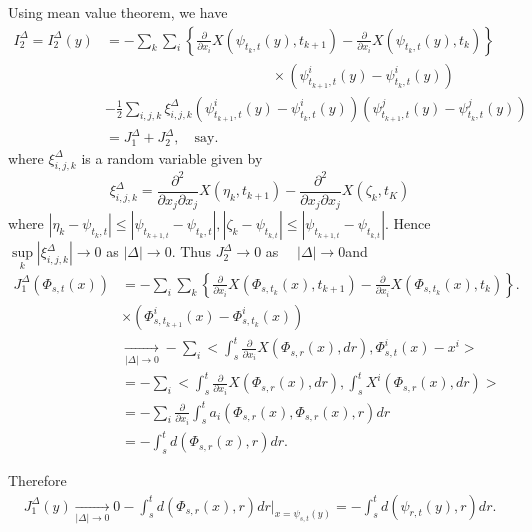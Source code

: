 Using mean value theorem, we have
\begin{align*}
  I_2^{\Delta} = I_2^{\Delta}(y) & = - \sum_k \sum_i \left\{
  \frac{\partial}{\partial x_i} X(\psi_{t_k, t}(y), t_{k+1})
  -\frac{\partial}{\partial x_i} X(\psi_{t_k,  t}(y), t_k) \right\}\\ 
  & \hspace{5cm} \times (\psi^i_{t_{k+1}, t}(y)- \psi^i_{t_k, t}(y))\\
  & - \frac{1}{2} \sum_{i, j, k} \xi^{\Delta}_{i, j,
    k}(\psi^i_{t_{k+1}, t}(y) - \psi^i_{t_k, t}(y)) (\psi^j_{t_{k+1},
    t}(y) - \psi^j_{t_k, t}(y))\\ 
  & = J^{\Delta}_1 + J^{\Delta}_2, \quad \text{say}.
\end{align*}
where $\xi^{\Delta}_{i, j, k}$ is a random variable given by
$$
\xi^{\Delta}_{i, j, k} = \frac{\partial^2}{\partial x_j \partial x_j} 
X(\eta_k, t_{k+1}) - \frac{\partial^2}{\partial x_j \partial x_j}
X(\zeta_k, t_K) 
$$
where $|\eta_k - \psi_{t_k, t}| \le |\psi_{t_{k+1, t}} - \psi_{t_k, t}|,
|\zeta_k - \psi_{t_{k, t}}|\le |\psi_{t_{k+1, t}} - \psi_{t_{k, t}}|$.
Hence \quad  $\sup\limits_k |\xi^{\Delta}_{i, j, k}| \rightarrow 0$
\quad as \quad $|\Delta|\rightarrow 0$. \quad  Thus \quad
$J^{\Delta}_2 \rightarrow 0$ \quad as $\quad   |\Delta|\rightarrow 0
$\quad and 
\begin{align*}
   J^{\Delta}_1 (\Phi_{s, t} (x)) &= - \sum _i \sum_k
   \left\{\frac{\partial} {\partial x_i} X(\Phi_{s, t_k}(x), t_{k+1}) -
  \frac{\partial}{\partial x_i} X(\Phi_{s, t_k} (x), t_k) \right\}. \\  
  & \times (\Phi^i_{s, t_{k+1}} (x) - \Phi^i_{s, t_{k}}(x))\\
  &\xrightarrow[|\Delta| \rightarrow 0]{} - \sum_i <\int_s^t
  \frac{\partial}{\partial x_i} X(\Phi_{s, r}(x), dr), \Phi^i_{s,
    t}(x)- x^i>\\ 
  & = - \sum_i <\int_s^t \frac{\partial}{\partial x_i} X(\Phi_{s,
    r}(x), dr), \int_s^t X^i (\Phi_{s, r}(x), dr)>\\ 
  & = - \sum_i \frac{\partial}{\partial x_i} \int_s^t a_i(\Phi_{s,
    r}(x), \Phi_{s, r}(x), r) dr\\ 
  & = - \int_s^t d(\Phi_{s, r} (x), r) dr.
\end{align*}

Therefore\pageoriginale
\begin{multline*}
  J^{\Delta}_1 (y){ \xrightarrow[|\Delta| \rightarrow 0]{}} 0-
  \int_s^t d(\Phi_{s,r}(x), r)dr |_{x = \psi_{s, t}(y)} 
  = - \int_s^t d(\psi_{r, t} (y), r)dr.
\end{multline*}

